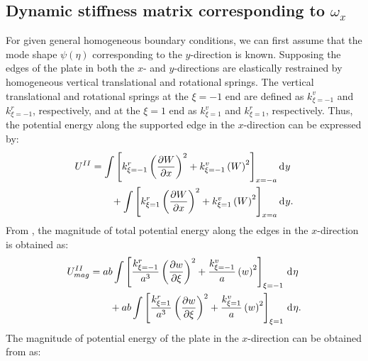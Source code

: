 \documentclass[preprint,12pt]{elsarticle}
\newcommand{\id}{\mathrm{d}\mkern1mu}
\begin{document}
\subsection{Dynamic stiffness matrix corresponding to $\omega_x$}\label{sec:DSMx}
For given general homogeneous boundary conditions, we can first assume that the mode shape $\psi(\eta)$ corresponding to the $y$-direction is known. 
Supposing the edges of the plate in both the $x$- and $y$-directions are elastically restrained by homogeneous vertical translational and rotational springs.
The vertical translational and rotational springs at the $\xi = -1$ end are defined as $k^v_{\xi = -1}$ and $k^r_{\xi = -1}$, respectively, and at the $\xi = 1$ end as $k^v_{\xi = 1}$ and $k^r_{\xi = 1}$, respectively. 
Thus, the potential energy along the supported edge in the $x$-direction can be expressed by:
%
\begin{equation}\label{eq:poten_energy_edgex}
	\begin{split}
		U^{II} &=  \int\left[k^r_{\xi=-1} \left( \frac{\partial W}{\partial x} \right)^2 + k^v_{\xi=-1} \left( W \right)^2\right]_{x=-a} \id y\\
		&\qquad +  \int\left[k^r_{\xi=1} \left( \frac{\partial W}{\partial x} \right)^2 + k^v_{\xi=1} \left( W \right)^2\right]_{x=a} \id y.
	\end{split}
\end{equation}
%
From , the magnitude of total potential energy along the edges in the $x$-direction is obtained as:
%
\begin{equation}\label{eq:poten_energy_edgex2}
	\begin{split}
		U^{II}_{mag} &= ab \int\left[\frac{k^r_{\xi=-1}}{a^3} \left( \frac{\partial w}{\partial \xi} \right)^2 + \frac{k^v_{\xi=-1}}{a} \left( w \right)^2\right]_{\xi=-1} \, \id \eta \\
		&\qquad + ab \int\left[\frac{k^r_{\xi=1}}{a^3} \left( \frac{\partial w}{\partial \xi} \right)^2 + \frac{k^v_{\xi=1}}{a} \left( w \right)^2\right]_{\xi=1} \, \id \eta.
	\end{split}
\end{equation}
%
The magnitude of potential energy of the plate in the $x$-direction can be obtained from  as:
%
\end{document}
